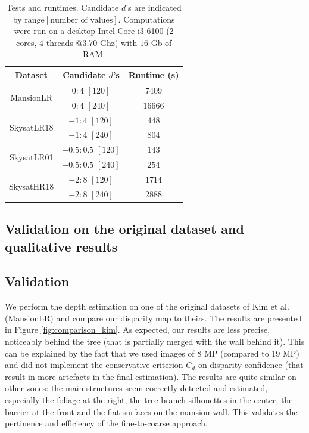 \documentclass{article}
\theoremstyle{definition}
\begin{document}
\begin{table}[ht]
\centering
  \begin{tabular}{|c|c|c|}
   \hline
  \textbf{Dataset} & \textbf{Candidate $d$'s} & \textbf{Runtime (s)}\\
  \hline \hline 
  \multirow{2}{*}{MansionLR} & $0:4$ $[120]$ & $7409$\\
  & $0:4$ $[240]$ & $16666$\\
  \hline 
  \multirow{2}{*}{SkysatLR18} & $-1:4$ $[120]$ & $448$\\
  & $-1:4$ $[240]$ & $804$\\
  \hline 
  \multirow{2}{*}{SkysatLR01} & $-0.5:0.5$ $[120]$ & $143$\\
  & $-0.5:0.5$ $[240]$ & $254$\\
  \hline 
  \multirow{2}{*}{SkysatHR18} & $-2:8$ $[120]$ & $1714$\\
  & $-2:8$ $[240]$ & $2888$\\
  \hline
  \end{tabular}

 \caption{Tests and runtimes. Candidate $d$'s are indicated by $\mathrm{range}[\text{number of values}]$. Computations were run on a desktop Intel Core i3-6100 (2 cores, 4 threads @3.70 Ghz) with $16$ Gb of RAM.}
 \label{table:tests}
\end{table}


\subsection{Validation on the original dataset and qualitative results}


\subsection{Validation} 


We perform the depth estimation on one of the original datasets of Kim et al. (MansionLR) and compare our disparity map to theirs. The results are presented in Figure \ref{fig:comparison_kim}. As expected, our results are less precise, noticeably behind the tree (that is partially merged with the wall behind it). This can be explained by the fact that we used images of 8 MP (compared to 19 MP) and did not implement the conservative criterion $C_d$ on disparity confidence (that result in more artefacts in the final estimation). The results are quite similar on other zones: the main structures seem correctly detected and estimated, especially the foliage at the right, the tree branch silhouettes in the center, the barrier at the front and the flat surfaces on the mansion wall. This validates the pertinence and efficiency of the fine-to-coarse approach.
\end{document}
